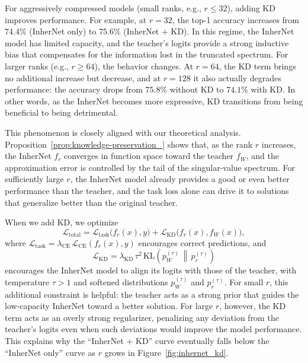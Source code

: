 \documentclass{article} %
\begin{document}
For aggressively compressed models (small ranks, e.g., $r \le 32$), adding KD improves performance. For example, at $r = 32$, the top-1 accuracy increases from $74.4\%$ (InherNet only) to $75.6\%$ (InherNet + KD). In this regime, the InherNet model has limited capacity, and the teacher's logits provide a strong inductive bias that compensates for the information lost in the truncated spectrum. For larger ranks (e.g., $r \ge 64$), the behavior changes. At $r = 64$, the KD term brings no additional increase but decrease, and at $r = 128$ it also actually degrades performance: the accuracy drops from $75.8\%$ without KD to $74.1\%$ with KD. In other words, as the InherNet becomes more expressive, KD transitions from being beneficial to being detrimental.

This phenomenon is closely aligned with our theoretical analysis. Proposition~\ref{prop:knowledge-preservation_} shows that, as the rank $r$ increases, the InherNet $f_r$ converges in function space toward the teacher $f_W$, and the approximation error is controlled by the tail of the singular-value spectrum. For sufficiently large $r$, the InherNet model already provides a good or even better performance than the teacher, and the task loss alone can drive it to solutions that generalize better than the original teacher.

When we add KD, we optimize
\begin{equation}
\label{eq:total-loss-inhernet-kd}
\mathcal{L}_{\text{total}}
= \mathcal{L}_{\text{task}}\bigl(f_r(x), y\bigr)
+ \mathcal{L}_{\text{KD}}\bigl(f_r(x), f_W(x)\bigr),
\end{equation}
where $\mathcal{L}_{\text{task}} = \lambda_{\text{CE}} \, \mathcal{L}_{\text{CE}}(f_r(x), y)$ encourages correct predictions, and
\begin{equation}
\mathcal{L}_{\text{KD}}
= \lambda_{\text{KD}} \, \tau^2 \,
\mathrm{KL}\!\left( p_W^{(\tau)} \,\middle\|\, p_r^{(\tau)} \right)
\end{equation}
encourages the InherNet model to align its logits with those of the teacher, with temperature $\tau > 1$ and softened distributions $p_W^{(\tau)}$ and $p_r^{(\tau)}$. For small $r$, this additional constraint is helpful: the teacher acts as a strong prior that guides the low-capacity InherNet toward a better solution. For large $r$, however, the KD term acts as an overly strong regularizer, penalizing any deviation from the teacher's logits even when such deviations would improve the model performance. This explains why the ``InherNet + KD'' curve eventually falls below the ``InherNet only'' curve as $r$ grows in Figure~\ref{fig:inhernet_kd}.
\end{document}
